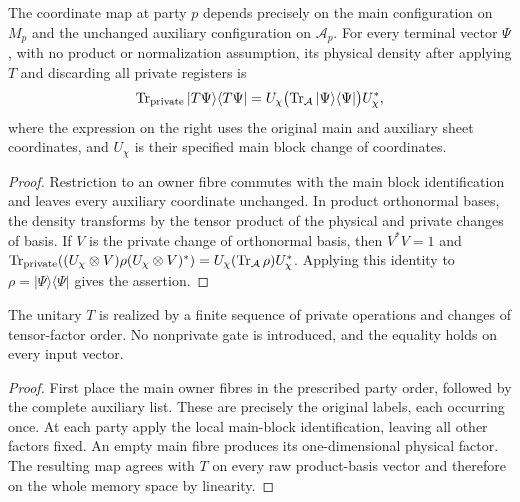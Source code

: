 \begin{lemma}
    \label{thm:chain_terminal_coordinates}
    \leanok
    The coordinate map at party $p$ depends precisely on the main
    configuration on $M_p$ and the unchanged auxiliary configuration on
    $\mathcal A_p$. For every terminal vector $\Psi$, with no product
    or normalization assumption, its physical density after applying
    $T$ and discarding all private registers is
    \begin{align}
        \operatorname{Tr}_{\rm private}|T\Psi\rangle\langle T\Psi|
        =U_\chi\bigl(\operatorname{Tr}_{\mathcal A}
        |\Psi\rangle\langle\Psi|\bigr)U_\chi^*,\notag
    \end{align}
    where the expression on the right uses the original main and
    auxiliary sheet coordinates, and $U_\chi$ is their specified main
    block change of coordinates.
\end{lemma}
\begin{proof}\leanok
    Restriction to an owner fibre commutes with the main block
    identification and leaves every auxiliary coordinate unchanged.
    In product orthonormal bases, the density transforms by the
    tensor product of the physical and private changes of basis.
    If $V$ is the private change of orthonormal basis, then
    $V^*V=1$ and $\operatorname{Tr}_{\rm private}((U_\chi\otimes V)
        \rho(U_\chi\otimes V)^*)=U_\chi(\operatorname{Tr}_{\mathcal A}\rho)U_\chi^*$.
    Applying this identity to $\rho=|\Psi\rangle\langle\Psi|$ gives the assertion.
\end{proof}

\begin{lemma}
    \label{thm:chain_terminal_private_operations}
    \leanok
    The unitary $T$ is realized by a finite sequence of private
    operations and changes of tensor-factor order. No nonprivate gate
    is introduced, and the equality holds on every input vector.
\end{lemma}
\begin{proof}\leanok
    First place the main owner fibres in the prescribed party order,
    followed by the complete auxiliary list. These are precisely the
    original labels, each occurring once. At each party apply the local
    main-block identification, leaving all other factors fixed.
    An empty main fibre produces its one-dimensional physical factor.
    The resulting map agrees with $T$ on every raw product-basis
    vector and therefore on the whole memory space by linearity.
\end{proof}


